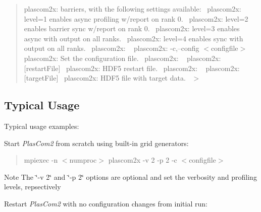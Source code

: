 \begin{quote}
plascom2x\+: barriers, with the following settings available\+:~\newline
plascom2x\+: level=1 enables async profiling w/report on rank 0.~\newline
plascom2x\+: level=2 enables barrier sync w/report on rank 0.~\newline
plascom2x\+: level=3 enables async with output on all ranks.~\newline
plascom2x\+: level=4 enables sync with output on all ranks.~\newline
plascom2x\+: ~\newline
plascom2x\+: -\/c,--config $<$configfile$>$~\newline
plascom2x\+: Set the configuration file.~\newline
plascom2x\+: ~\newline
plascom2x\+: \mbox{[}restart\+File\mbox{]}~\newline
plascom2x\+: H\+D\+F5 restart file.~\newline
plascom2x\+: ~\newline
plascom2x\+: \mbox{[}target\+File\mbox{]}~\newline
plascom2x\+: H\+D\+F5 file with target data.~\newline
$>$~\newline
\end{quote}
\hypertarget{user_reference_typicalusage}{}\subsection{Typical Usage}\label{user_reference_typicalusage}
Typical usage examples\+:


\begin{DoxyItemize}
\item Start {\itshape Plas\+Com2} from scratch using built-\/in grid generators\+:
\end{DoxyItemize}

\begin{quote}
mpiexec -\/n $<$numproc$>$ plascom2x -\/v 2 -\/p 2 -\/c $<$configfile$>$~\newline
\end{quote}


\begin{DoxyNote}{Note}
The \char`\"{}-\/v 2\char`\"{} and \char`\"{}-\/p 2\char`\"{} options are optional and set the verbosity and profiling levels, repsectively
\end{DoxyNote}

\begin{DoxyItemize}
\item Restart {\itshape Plas\+Com2} with no configuration changes from initial run\+:
\end{DoxyItemize}

